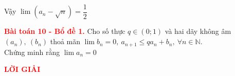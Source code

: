 \documentclass[a4paper, 12pt]{article}
\numberwithin{equation}{section}
\begin{document}
    Vậy $\lim \left(a_n - \sqrt{n}\right) = \dfrac{1}{2}$
    \newpage
    \begin{BoxRed}
	\textbf{\textcolor{red}{Bài toán 10 - Bổ đề 1.}} 
         Cho số thực $q \in (0; 1)$ và hai dãy không âm $(a_n), \ (b_n)$ thoả mãn
         $\lim b_n = 0, \ a_{n+1} \leq q a_n + b_n, \ \forall n \in \mathbb{N}$.\\ 
    Chứng minh rằng $\lim a_n = 0$
	\end{BoxRed} 
	\textbf{\textcolor{red}{LỜI GIẢI}} \\
    
\end{document}
